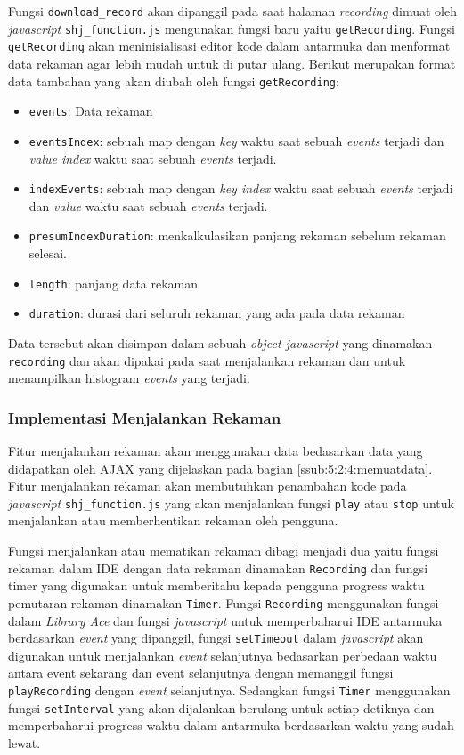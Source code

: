 Fungsi \verb|download_record| akan dipanggil pada saat halaman \textit{recording} dimuat oleh \textit{javascript} \verb|shj_function.js| mengunakan fungsi baru yaitu \verb|getRecording|. Fungsi \verb|getRecording| akan meninisialisasi editor kode dalam antarmuka dan menformat data rekaman agar lebih mudah untuk di putar ulang. Berikut merupakan format data tambahan yang akan diubah oleh fungsi \verb|getRecording|:

\begin{itemize}
    \item \verb|events|: Data rekaman
    \item \verb|eventsIndex|: sebuah map dengan \textit{key} waktu saat sebuah \textit{events} terjadi dan \textit{value index} waktu saat sebuah \textit{events} terjadi.
    \item \verb|indexEvents|: sebuah map dengan \textit{key index} waktu saat sebuah \textit{events} terjadi dan \textit{value} waktu saat sebuah \textit{events} terjadi.
    \item \verb|presumIndexDuration|: menkalkulasikan panjang rekaman sebelum rekaman selesai.
    \item \verb|length|: panjang data rekaman
    \item \verb|duration|: durasi dari seluruh rekaman yang ada pada data rekaman
\end{itemize}

Data tersebut akan disimpan dalam sebuah \textit{object javascript} yang dinamakan \verb|recording| dan akan dipakai pada saat menjalankan rekaman dan untuk menampilkan histogram \textit{events} yang terjadi.

\subsubsection{Implementasi Menjalankan Rekaman}
 
Fitur menjalankan rekaman akan menggunakan data bedasarkan data yang didapatkan oleh AJAX yang dijelaskan pada bagian \ref{ssub:5:2:4:memuatdata}. Fitur menjalankan rekaman akan membutuhkan penambahan kode pada \textit{javascript} \verb|shj_function.js| yang akan menjalankan fungsi \verb|play| atau \verb|stop| untuk menjalankan atau memberhentikan rekaman oleh pengguna. 

Fungsi menjalankan atau mematikan rekaman dibagi menjadi dua yaitu fungsi rekaman dalam IDE dengan data rekaman dinamakan \verb|Recording| dan fungsi timer yang digunakan untuk memberitahu kepada pengguna progress waktu pemutaran rekaman dinamakan \verb|Timer|.
Fungsi \verb|Recording| menggunakan fungsi dalam \textit{Library Ace} dan fungsi \textit{javascript} untuk memperbaharui IDE antarmuka berdasarkan \textit{event} yang dipanggil, fungsi \verb|setTimeout| dalam \textit{javascript} akan digunakan untuk menjalankan \textit{event} selanjutnya bedasarkan perbedaan waktu antara event sekarang dan event selanjutnya dengan memanggil fungsi \verb|playRecording| dengan \textit{event} selanjutnya. Sedangkan fungsi \verb|Timer| menggunakan fungsi \verb|setInterval| yang akan dijalankan berulang untuk setiap detiknya dan memperbaharui progress waktu dalam antarmuka berdasarkan waktu yang sudah lewat.


